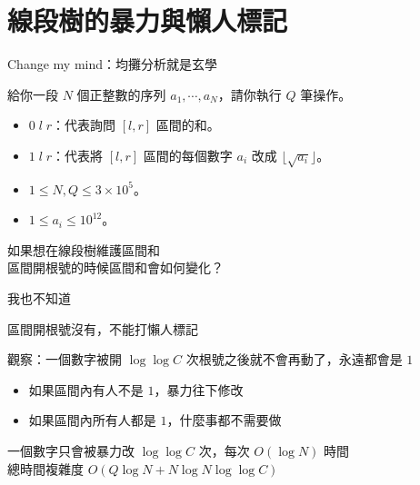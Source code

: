 \section{線段樹的暴力與懶人標記}

\begin{frame}{\ebtitle}
    Change my mind：均攤分析就是玄學
\end{frame}

\begin{frame}{}
    \begin{problem}
        給你一段 $N$ 個正整數的序列 $a_1,\cdots,a_N$，請你執行 $Q$ 筆操作。

        \begin{itemize}
            \item $0\;l\;r$：代表詢問 $[l,r]$ 區間的和。
            \item $1\;l\;r$：代表將 $[l,r]$ 區間的每個數字 $a_i$ 改成 $\lfloor{\sqrt{a_i}}\rfloor$。
        \end{itemize}

        \begin{itemize}
            \item $1\le N,Q\le 3\times 10^5$。
            \item $1\le a_i\le 10^{12}$。
        \end{itemize}
    \end{problem}
\end{frame}

\begin{frame}{}
    如果想在線段樹維護區間和 \\
    區間開根號的時候區間和會如何變化？

     {
        我也不知道 

        區間開根號沒有，不能打懶人標記
    }
\end{frame}

\begin{frame}{}
    觀察：一個數字被開 $\log \log C$ 次根號之後就不會再動了，永遠都會是 $1$

     {
        \begin{itemize}
            \item 如果區間內有人不是 $1$，暴力往下修改
            \item 如果區間內所有人都是 $1$，什麼事都不需要做
        \end{itemize}

        一個數字只會被暴力改 $\log \log C$ 次，每次 $O(\log N)$ 時間 \\
        總時間複雜度 $O(Q \log N + N \log N \log\log C)$
    }
\end{frame}

